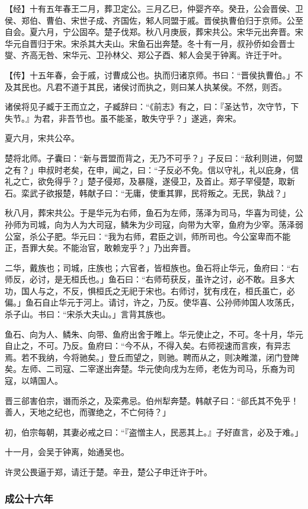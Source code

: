 \documentclass[]{article}
\begin{document}
【经】十有五年春王二月，葬卫定公。三月乙巳，仲婴齐卒。癸丑，公会晋侯、卫侯、郑伯、曹伯、宋世子成、齐国佐，邾人同盟于戚。晋侯执曹伯归于京师。公至自会。夏六月，宁公固卒。楚子伐郑。秋八月庚辰，葬宋共公。宋华元出奔晋。宋华元自晋归于宋。宋杀其大夫山。宋鱼石出奔楚。冬十有一月，叔孙侨如会晋士燮、齐高无咎、宋华元、卫孙林父、郑公子酉、邾人会吴于钟离。许迁于叶。

【传】十五年春，会于戚，讨曹成公也。执而归诸京师。书曰：``晋侯执曹伯。」不及其民也。凡君不道于其民，诸侯讨而执之，则曰某人执某侯。不然，则否。

诸侯将见子臧于王而立之，子臧辞曰：``《前志》有之，曰：『圣达节，次守节，下失节。』为君，非吾节也。虽不能圣，敢失守乎？」遂逃，奔宋。

夏六月，宋共公卒。

楚将北师。子囊曰：``新与晋盟而背之，无乃不可乎？」子反曰：``敌利则进，何盟之有？」申叔时老矣，在申，闻之，曰：``子反必不免。信以守礼，礼以庇身，信礼之亡，欲免得乎？」楚子侵郑，及暴隧，遂侵卫，及首止。郑子罕侵楚，取新石。栾武子欲报楚，韩献子曰：``无庸，使重其罪，民将叛之。无民，孰战？」

秋八月，葬宋共公。于是华元为右师，鱼石为左师，荡泽为司马，华喜为司徒，公孙师为司城，向为人为大司寇，鳞朱为少司寇，向带为大宰，鱼府为少宰。荡泽弱公室，杀公子肥。华元曰：``我为右师，君臣之训，师所司也。今公室卑而不能正，吾罪大矣。不能治官，敢赖宠乎？」乃出奔晋。

二华，戴族也；司城，庄族也；六官者，皆桓族也。鱼石将止华元，鱼府曰：``右师反，必讨，是无桓氏也。」鱼石曰：``右师苟获反，虽许之讨，必不敢。且多大功，国人与之，不反，惧桓氏之无祀于宋也。右师讨，犹有戌在，桓氏虽亡，必偏。」鱼石自止华元于河上。请讨，许之，乃反。使华喜、公孙师帅国人攻荡氏，杀子山。书曰：``宋杀大夫山。」言背其族也。

鱼石、向为人、鳞朱、向带、鱼府出舍于睢上。华元使止之，不可。冬十月，华元自止之，不可。乃反。鱼府曰：``今不从，不得入矣。右师视速而言疾，有异志焉。若不我纳，今将驰矣。」登丘而望之，则驰。聘而从之，则决睢澨，闭门登陴矣。左师、二司寇、二宰遂出奔楚。华元使向戌为左师，老佐为司马，乐裔为司寇，以靖国人。

晋三郤害伯宗，谮而杀之，及栾弗忌。伯州犁奔楚。韩献子曰：``郤氏其不免乎！善人，天地之纪也，而骤绝之，不亡何待？」

初，伯宗每朝，其妻必戒之曰：``『盗憎主人，民恶其上。』子好直言，必及于难。」

十一月，会吴于钟离，始通吴也。

许灵公畏逼于郑，请迁于楚。辛丑，楚公子申迁许于叶。

\hypertarget{header-n1730}{%
\subsubsection{成公十六年}\label{header-n1730}}
\end{document}
